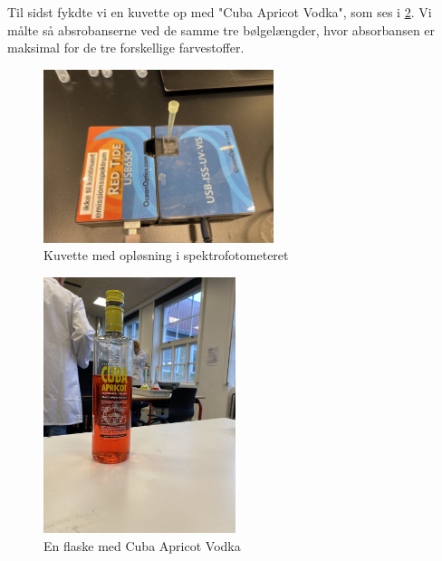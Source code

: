 \documentclass[11pt]{article}
\theoremstyle{definition}
\begin{document}
Til sidst fykdte vi en kuvette op med "Cuba Apricot Vodka", som ses i \cref{fig:vodka}.
Vi målte så absrobanserne ved de samme tre bølgelængder, hvor absorbansen er maksimal for de tre forskellige farvestoffer. 
\begin{figure}[H]
\begin{center}
  \includegraphics[width=0.6\textwidth]{spektro.jpg}
\end{center}
\caption{Kuvette med opløsning i spektrofotometeret}
\label{fig:spektro}
\end{figure}
\begin{figure}[H]
\begin{center}
  \includegraphics[width=0.5\textwidth]{vodka.jpg}
\end{center}
\caption{En flaske med Cuba Apricot Vodka}
\label{fig:vodka}
\end{figure}
\end{document}
